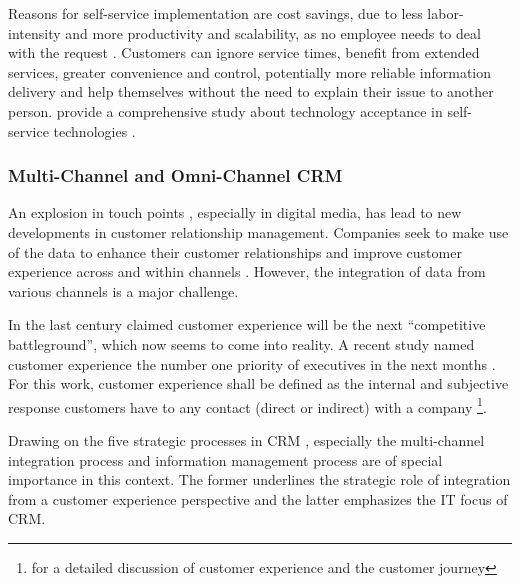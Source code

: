 		Reasons for self-service implementation are cost savings, due to less labor-intensity and more productivity and scalability, as no employee needs to deal with the request \citep{Walker_2002, Walker_2003}. Customers can ignore service times, benefit from extended services, greater convenience and control, potentially more reliable information delivery and help themselves without the need to explain their issue to another person. \citeauthor{Blut_2016} provide a comprehensive study about technology acceptance in self-service technologies \citep{Blut_2016}. 
		
	\subsubsection{Multi-Channel and Omni-Channel CRM}
		An explosion in touch points \citep{Lemon_2016}, especially in digital media, has lead to new developments in customer relationship management. Companies seek to make use of the data to enhance their customer relationships and improve customer experience across and within channels \citep{Frow_2007}. However, the integration of data from various channels is a major challenge. 
		
		In the last century \citeauthor{gilmore1998} claimed customer experience will be the next \enquote{competitive battleground}, which now seems to come into reality. A recent study named customer experience the number one priority of executives in the next months \citep{accenture2015}. For this work, customer experience shall be defined as the internal and subjective response customers have to any contact (direct or indirect) with a company \citep{meyer2007customer}\footnote{\cf \cite{Lemon_2016} for a detailed discussion of customer experience and the customer journey }.
		
		Drawing on the five strategic processes in \acrshort{CRM} \citep{payne2004role}, especially the multi-channel integration process and information management process are of special importance in this context. The former underlines the strategic role of integration from a customer experience perspective and the latter emphasizes the IT focus of CRM. 
		
